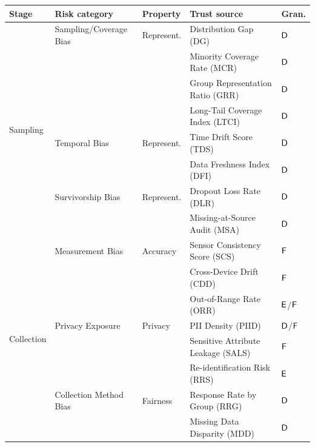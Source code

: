 \begin{table}[!htbp]
  \centering
  \footnotesize
  \setlength{\tabcolsep}{4pt}
  \renewcommand{\arraystretch}{1.12}
  \begin{tabular}{@{}lllll@{}}
    \toprule
    \textbf{Stage} & \textbf{Risk category} & \textbf{Property} & \textbf{Trust source} & \textbf{Gran.} \\
    \midrule
    \multirow{8}{*}{Sampling}
      & Sampling/Coverage Bias & Represent. & Distribution Gap (DG)               & $\textsf{D}$ \\
      &                        &            & Minority Coverage Rate (MCR)        & $\textsf{D}$ \\
      &                        &            & Group Representation Ratio (GRR)    & $\textsf{D}$ \\
      &                        &            & Long-Tail Coverage Index (LTCI)     & $\textsf{D}$ \\
      & Temporal Bias          & Represent. & Time Drift Score (TDS)              & $\textsf{D}$ \\
      &                        &            & Data Freshness Index (DFI)          & $\textsf{D}$ \\
      & Survivorship Bias      & Represent. & Dropout Loss Rate (DLR)             & $\textsf{D}$ \\
      &                        &            & Missing-at-Source Audit (MSA)       & $\textsf{D}$ \\
    \midrule
    \multirow{8}{*}{Collection}
      & Measurement Bias       & Accuracy   & Sensor Consistency Score (SCS)      & $\textsf{F}$ \\
      &                        &            & Cross-Device Drift (CDD)            & $\textsf{F}$ \\
      &                        &            & Out-of-Range Rate (ORR)             & $\textsf{E}$/$\textsf{F}$ \\
      & Privacy Exposure       & Privacy    & PII Density (PIID)                  & $\textsf{D}$/$\textsf{F}$ \\
      &                        &            & Sensitive Attribute Leakage (SALS)  & $\textsf{F}$ \\
      &                        &            & Re-identification Risk (RRS)        & $\textsf{E}$ \\
      & Collection Method Bias & Fairness   & Response Rate by Group (RRG)        & $\textsf{D}$ \\
      &                        &            & Missing Data Disparity (MDD)        & $\textsf{D}$ \\

\end{tabular}
\end{table}

